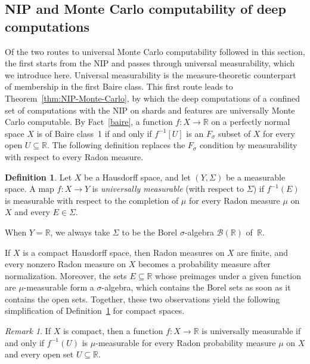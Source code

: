 \documentclass[psamsfonts]{amsart}
\theoremstyle{definition}
\newtheorem{defn}[thm]{Definition}
\theoremstyle{remark}
\newtheorem{rem}[thm]{Remark}
\numberwithin{equation}{section}
\begin{document}
\subsection{NIP and Monte Carlo computability of deep computations}

Of the two routes to universal Monte Carlo computability followed in this section, the first starts from the NIP and passes through universal measurability, which we introduce here.
Universal measurability is the measure-theoretic counterpart of membership in the first Baire class.
This first route leads to Theorem~\ref{thm:NIP-Monte-Carlo}, by which the deep computations of a confined set of computations with the NIP on shards and features are universally Monte Carlo computable.
By Fact~\ref{baire}, a function $f\colon X\to\mathbb{R}$ on a perfectly normal space $X$ is of Baire class~1 if and only if $f^{-1}[U]$ is an $F_\sigma$ subset of $X$ for every open $U\subseteq \mathbb{R}$.
The following definition replaces the $F_\sigma$ condition by measurability with respect to every Radon measure.

\begin{defn}
  \label{def:universal-measurability}
  Let $X$ be a Hausdorff space, and let $(Y,\Sigma)$ be a measurable space.
  A map $f:X\rightarrow Y$ is \emph{universally measurable} (with respect to $\Sigma$) if $f^{-1}(E)$ is measurable with respect to the completion of $\mu$ for every Radon measure $\mu$ on $X$ and every $E\in\Sigma$.
\end{defn}

When $Y=\mathbb{R}$, we always take $\Sigma$ to be the Borel $\sigma$-algebra $\mathcal{B}(\mathbb{R})$ of~$\mathbb{R}$.

If $X$ is a compact Hausdorff space, then Radon measures on $X$ are finite, and every nonzero Radon measure on $X$ becomes a probability measure after normalization.
Moreover, the sets $E\subseteq\mathbb{R}$ whose preimages under a given function are $\mu$-measurable form a $\sigma$-algebra, which contains the Borel sets as soon as it contains the open sets.
Together, these two observations yield the following simplification of Definition~\ref{def:universal-measurability} for compact spaces.

\begin{rem}
  \label{rem:probability}
  If $X$ is compact, then a function $f:X\rightarrow\mathbb{R}$ is universally measurable if and only if $f^{-1}(U)$ is $\mu$-measurable for every Radon probability measure $\mu$ on $X$ and every open set $U\subseteq\mathbb{R}$.
\end{rem}
\end{document}
